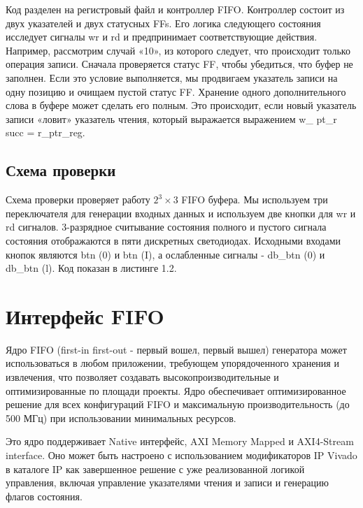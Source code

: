 

Код разделен на регистровый файл и контроллер FIFO. Контроллер состоит из двух указателей и двух статусных FFs. Его логика следующего состояния исследует сигналы wr и rd и предпринимает соответствующие действия. Например, рассмотрим случай «10», из которого следует, что происходит только операция записи. Сначала проверяется статус FF, чтобы убедиться, что буфер не заполнен. Если это условие выполняется, мы продвигаем указатель записи на одну позицию и очищаем пустой статус FF. Хранение одного дополнительного слова в буфере может сделать его полным. Это происходит, если новый указатель записи «ловит» указатель чтения, который выражается выражением  w\_ pt\_r succ = r\_ptr\_reg.

\subsection{Схема проверки}

Схема проверки проверяет работу  $2^{3} \times 3$ FIFO буфера. Мы используем три переключателя для генерации входных данных и используем две кнопки для wr и rd сигналов. 3-разрядное считывание состояния полного и пустого сигнала состояния отображаются в пяти дискретных светодиодах. Исходными входами кнопок являются btn (0) и btn (I), а ослабленные сигналы - db\_btn (0) и db\_btn (l). Код показан в листинге 1.2.



\section{Интерфейс FIFO}

Ядро FIFO (first-in first-out - первый вошел, первый вышел) генератора может использоваться в любом приложении, требующем упорядоченного
хранения и извлечения, что позволяет создавать высокопроизводительные и оптимизированные по площади проекты.
Ядро обеспечивает оптимизированное решение для всех конфигураций FIFO и  максимальную производительность (до 500 МГц) при использовании
минимальных ресурсов.

Это ядро поддерживает Native интерфейс, AXI Memory Mapped и AXI4-Stream interface.
Оно может быть настроено с использованием модификаторов IP Vivado в каталоге
IP как завершенное решение с уже реализованной логикой управления, включая управление указателями
чтения и записи и генерацию флагов состояния.


